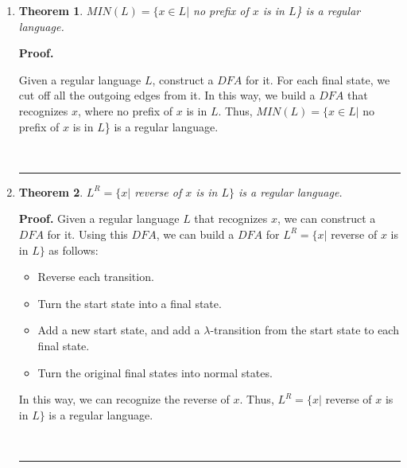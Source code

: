 \documentclass{article}%
\newtheorem{theorem}{Theorem}
\newenvironment{proof}[1][Proof]{\textbf{#1.} }{\ \rule{0.5em}{0.5em}}
\begin{document}
\begin{enumerate}
\begin{enumerate}
\item  
 \begin{theorem}
    $MIN(L) = \{ x \in L |$ no prefix of $x$ is in $L$\} is a regular language.
    
    \end{theorem}	
    \begin{proof}

    Given a regular language $L$, construct a $DFA$ for it. For each final state, we cut off all the outgoing edges from it. In this way, we build a $DFA$ that recognizes $x$, where no prefix of $x$ is in $L$.
    Thus, $MIN(L) = \{ x \in L |$ no prefix of $x$ is in $L$\} is a regular language.
   
    
    \end{proof}
    

 \item 
    \begin{theorem}
     $L^R  = \{ x|$ reverse of $x$ is in $L\}$ is a regular language.
    
    \end{theorem}	
    \begin{proof}
    Given a regular language $L$ that recognizes $x$, we can construct a $DFA$ for it. Using this $DFA$, we can build a $DFA$ for $L^R  = \{ x|$ reverse of $x$ is in $L\}$ as follows:
    
    \begin{itemize}
    \item Reverse each transition. 
    \item Turn the start state into a final state.
    \item Add a new start state, and add a $\lambda$-transition from the start state to each final state.
    \item Turn the original final states into normal states.
    \end{itemize} 
    
    In this way, we can recognize the reverse of $x$. Thus, $L^R  = \{ x|$ reverse of $x$ is in $L\}$ is a regular language.
    

   
    
    \end{proof}
\end{enumerate}
	
\end{enumerate}
\end{document}
